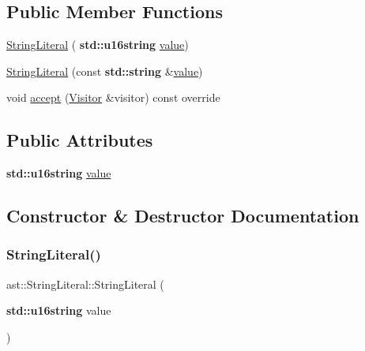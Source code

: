 \subsection*{Public Member Functions}
\begin{DoxyCompactItemize}
\item 
\hyperlink{structast_1_1_string_literal_a4584a1a513c8e6827d874bc8cbd5e040}{String\+Literal} (\textbf{ std\+::u16string} \hyperlink{structast_1_1_string_literal_ae29e252908fc00142e9b79371795a2e5}{value})
\item 
\hyperlink{structast_1_1_string_literal_aebc9195c9b488b10378322fcd2fd69e4}{String\+Literal} (const \textbf{ std\+::string} \&\hyperlink{structast_1_1_string_literal_ae29e252908fc00142e9b79371795a2e5}{value})
\item 
void \hyperlink{structast_1_1_string_literal_abf4cae9ed97b2f9b9cf92f2a06f1ec74}{accept} (\hyperlink{structast_1_1_visitor}{Visitor} \&visitor) const override
\end{DoxyCompactItemize}
\subsection*{Public Attributes}
\begin{DoxyCompactItemize}
\item 
\textbf{ std\+::u16string} \hyperlink{structast_1_1_string_literal_ae29e252908fc00142e9b79371795a2e5}{value}
\end{DoxyCompactItemize}


\subsection{Constructor \& Destructor Documentation}
\mbox{\label{structast_1_1_string_literal_a4584a1a513c8e6827d874bc8cbd5e040}} 
\subsubsection{\texorpdfstring{String\+Literal()}{StringLiteral()}\hspace{0.1cm}{\footnotesize\ttfamily [1/2]}}
{\footnotesize\ttfamily ast\+::\+String\+Literal\+::\+String\+Literal (\begin{DoxyParamCaption}\item[{\textbf{ std\+::u16string}}]{value }\end{DoxyParamCaption})\hspace{0.3cm}{\ttfamily [inline]}}

